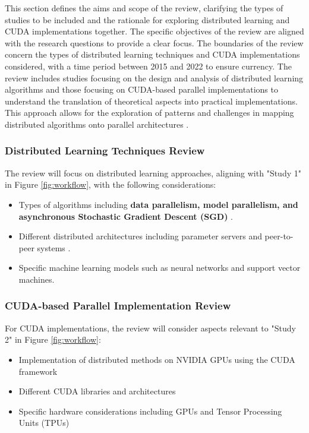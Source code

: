 This section defines the aims and scope of the review, clarifying the types of studies to be included and the rationale for exploring distributed learning and CUDA implementations together. The specific objectives of the review are aligned with the research questions to provide a clear focus. The boundaries of the review concern the types of distributed learning techniques and CUDA implementations considered, with a time period between 2015 and 2022 to ensure currency. The review includes studies focusing on the design and analysis of distributed learning algorithms and those focusing on CUDA-based parallel implementations to understand the translation of theoretical aspects into practical implementations. This approach allows for the exploration of patterns and challenges in mapping distributed algorithms onto parallel architectures .

\subsubsection{Distributed Learning Techniques Review}
The review will focus on distributed learning approaches, aligning with "Study 1" in Figure \ref{fig:workflow},
with the following considerations:
\begin{itemize}
    \item Types of algorithms including \textbf{data parallelism, model parallelism, and asynchronous
    Stochastic Gradient Descent (SGD)} \cite{ben-nun_demystifying_2020,langer_distributed_2020}.
    \item Different distributed architectures including parameter servers and peer-to-peer systems \cite{verbraeken_survey_2021,ben-nun_demystifying_2020,langer_distributed_2020}.
    \item Specific machine learning models such as neural networks and support vector machines.
\end{itemize}

\subsubsection{CUDA-based Parallel Implementation Review}
For CUDA implementations, the review will consider aspects relevant to "Study 2" in Figure \ref{fig:workflow}:
\begin{itemize}
    \item Implementation of distributed methods on NVIDIA GPUs using the CUDA framework
    \item Different CUDA libraries and architectures
    \item Specific hardware considerations including GPUs and Tensor Processing Units (TPUs)
\end{itemize}

